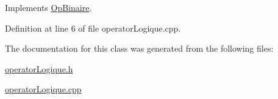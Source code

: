 Implements \hyperlink{class_op_binaire_afb16dbd5f455b97afb5c07fae29b94fc}{Op\+Binaire}.



Definition at line 6 of file operator\+Logique.\+cpp.



The documentation for this class was generated from the following files\+:\begin{DoxyCompactItemize}
\item 
\hyperlink{operator_logique_8h}{operator\+Logique.\+h}\item 
\hyperlink{operator_logique_8cpp}{operator\+Logique.\+cpp}\end{DoxyCompactItemize}
